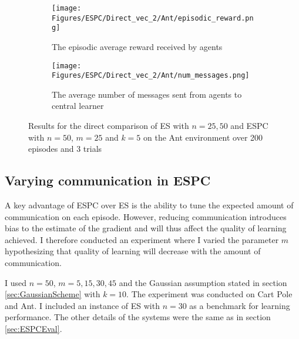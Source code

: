 \begin{figure}[H]
    \centering
    \begin{subfigure}{0.6\textwidth}
        \centering
        \texttt{[image: Figures/ESPC/Direct\_vec\_2/Ant/episodic\_reward.png]}
        \caption{The episodic average reward received by agents}
        \label{fig:AntEpisodicReward}
    \end{subfigure}
    \begin{subfigure}{0.6\textwidth}
        \centering
        \texttt{[image: Figures/ESPC/Direct\_vec\_2/Ant/num\_messages.png]}
        \caption{The average number of messages sent from agents to central learner}
        \label{fig:AntMessages}
    \end{subfigure}
    \caption{Results for the direct comparison of ES with $n=25,50$ and ESPC with $n=50$, $m=25$ and $k=5$ on the Ant environment over 200 episodes and 3 trials}
    \label{fig:DirectAnt}
\end{figure}


\subsection{Varying communication in ESPC}
A key advantage of ESPC over ES is the ability to tune the expected amount of communication on each episode. However, reducing communication introduces bias to the estimate of the gradient and will thus affect the quality of learning achieved. I therefore conducted an experiment where I varied the parameter $m$ hypothesizing that quality of learning will decrease with the amount of communication.

I used $n=50$, $m=5,15,30,45$ and the Gaussian assumption stated in section \ref{sec:GaussianScheme} with $k=10$. The experiment was conducted on Cart Pole and Ant. I included an instance of ES with $n=30$ as a benchmark for learning performance. The other details of the systems were the same as in section \ref{sec:ESPCEval}.

